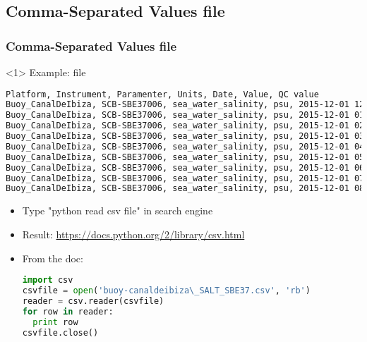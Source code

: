 \subsection{Comma-Separated Values file}
\begin{frame}[fragile]
\frametitle{Comma-Separated Values file}

\begin{onlyenv}<1>
Example: file 

\begin{lstlisting}[language=bash,basicstyle=\tiny,title={Example of CSV file}]
Platform, Instrument, Paramenter, Units, Date, Value, QC value 
Buoy_CanalDeIbiza, SCB-SBE37006, sea_water_salinity, psu, 2015-12-01 12:00:00, 36.916, 1.0
Buoy_CanalDeIbiza, SCB-SBE37006, sea_water_salinity, psu, 2015-12-01 01:00:00, 36.936, 1.0
Buoy_CanalDeIbiza, SCB-SBE37006, sea_water_salinity, psu, 2015-12-01 02:00:00, 36.929, 1.0
Buoy_CanalDeIbiza, SCB-SBE37006, sea_water_salinity, psu, 2015-12-01 03:00:00, 36.927, 1.0
Buoy_CanalDeIbiza, SCB-SBE37006, sea_water_salinity, psu, 2015-12-01 04:00:00, 36.925, 1.0
Buoy_CanalDeIbiza, SCB-SBE37006, sea_water_salinity, psu, 2015-12-01 05:00:00, 36.948, 1.0
Buoy_CanalDeIbiza, SCB-SBE37006, sea_water_salinity, psu, 2015-12-01 06:00:00, 36.95, 1.0
Buoy_CanalDeIbiza, SCB-SBE37006, sea_water_salinity, psu, 2015-12-01 07:00:00, 36.954, 1.0
Buoy_CanalDeIbiza, SCB-SBE37006, sea_water_salinity, psu, 2015-12-01 08:00:00, 36.933, 1.0
\end{lstlisting}
\end{onlyenv}

\begin{itemize}
\item<2-> Type "python read csv file" in search engine
\item<3-> Result: \url{https://docs.python.org/2/library/csv.html}\\
\item<4-> From the doc:
\begin{lstlisting}[language=python,basicstyle=\tiny]
import csv
csvfile = open('buoy-canaldeibiza\_SALT_SBE37.csv', 'rb')
reader = csv.reader(csvfile)
for row in reader:
  print row
csvfile.close()
\end{lstlisting}
\end{itemize}

\end{frame}

